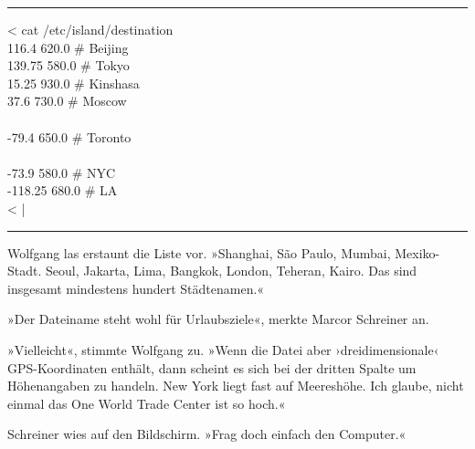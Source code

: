 \noindent \parbox{\textwidth}{ \vspace{3ex} \hrule \vspace{3ex}

    \begin{tiny}
    \begin{ttfamily}

\noindent \textless{} cat /etc/island/destination\\
 116.4 620.0 \# Beijing\\
 139.75 580.0 \# Tokyo\\
 15.25 930.0 \# Kinshasa\\
 37.6 730.0 \# Moscow\\
\noindent […]\\
 -79.4 650.0 \# Toronto\\
\noindent […]\\
 -73.9 580.0 \# NYC\\
 -118.25 680.0 \# LA\\
\noindent \textless{} |

    \end{ttfamily}
    \end{tiny}

\vspace{3ex} \hrule \vspace{3ex} }

Wolfgang las erstaunt die Liste vor. »Shanghai, São Paulo, Mumbai, Mexiko-Stadt. Seoul, Jakarta, Lima, Bangkok, London, Teheran, Kairo. Das sind insgesamt mindestens hundert Städtenamen.«

»Der Dateiname steht wohl für Urlaubsziele«, merkte Marcor Schreiner an.

»Vielleicht«, stimmte Wolfgang zu. »Wenn die Datei aber ›dreidimensionale‹ GPS-Koordinaten enthält, dann scheint es sich bei der dritten Spalte um Höhenangaben zu handeln. New York liegt fast auf Meereshöhe. Ich glaube, nicht einmal das One World Trade Center ist so hoch.«

Schreiner wies auf den Bildschirm. »Frag doch einfach den Computer.«

